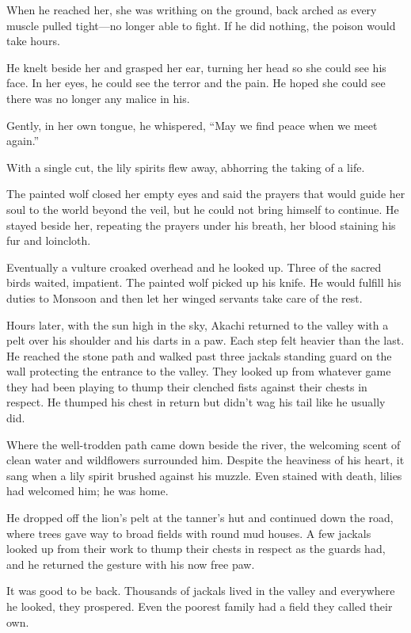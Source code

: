 When he reached her, she was writhing on the ground, back arched as every muscle pulled tight---no longer able to fight. If he did nothing, the poison would take hours. 

He knelt beside her and grasped her ear, turning her head so she could see his face. In her eyes, he could see the terror and the pain. He hoped she could see there was no longer any malice in his.

Gently, in her own tongue, he whispered, ``May we find peace when we meet again.''

With a single cut, the lily spirits flew away, abhorring the taking of a life.

The painted wolf closed her empty eyes and said the prayers that would guide her soul to the world beyond the veil, but he could not bring himself to continue. He stayed beside her, repeating the prayers under his breath, her blood staining his fur and loincloth.

Eventually a vulture croaked overhead and he looked up. Three of the sacred birds waited, impatient. The painted wolf picked up his knife. He would fulfill his duties to Monsoon and then let her winged servants take care of the rest.

\secdiv

\noindent Hours later, with the sun high in the sky, Akachi returned to the valley with a pelt over his shoulder and his darts in a paw. Each step felt heavier than the last. He reached the stone path and walked past three jackals standing guard on the wall protecting the entrance to the valley. They looked up from whatever game they had been playing to thump their clenched fists against their chests in respect. He thumped his chest in return but didn't wag his tail like he usually did.

Where the well-trodden path came down beside the river, the welcoming scent of clean water and wildflowers surrounded him. Despite the heaviness of his heart, it sang when a lily spirit brushed against his muzzle. Even stained with death, lilies had welcomed him; he was home.

He dropped off the lion's pelt at the tanner's hut and continued down the road, where trees gave way to broad fields with round mud houses. A few jackals looked up from their work to thump their chests in respect as the guards had, and he returned the gesture with his now free paw. 

It was good to be back. Thousands of jackals lived in the valley and everywhere he looked, they prospered. Even the poorest family had a field they called their own. 

